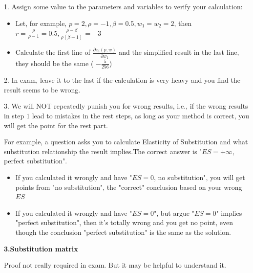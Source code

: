 \documentclass{article}
\begin{document}
\begin{mdframed}[backgroundcolor=yellow!20,linecolor=white]
1. Assign some value to the parameters and variables to verify your calculation:

\begin{itemize}
\item Let, for example, $p = 2, \rho = -1, \beta = 0.5, w_1 = w_2 = 2$, then $r =  \frac{\rho}{\rho -1} = 0.5 , \frac{\rho -\beta}{\rho(\beta -1)} = -3$
\item Calculate the first line of $\frac{\partial x_i(p,w)}{\partial w_1}$ and the simplified result in the last line, they should be the same ( $- \frac{5}{256}$)
\end{itemize}
2. In exam, leave it to the last if the calculation is very heavy and you find the result seems to be wrong.

3. We will NOT repeatedly punish you for wrong results, i.e., if the wrong results in step $1$ lead to mistakes in the rest steps, as long as your method is correct, you will get the point for the rest part. 

For example, a question asks you to calculate Elasticity of Substitution and  what substitution relationship the result implies.The correct answer is "$ES = + \infty$, perfect substitution". 
\begin{itemize}
\item   If you calculated it wrongly and have "$ES = 0$, no substitution", you will get points from "no substitution", the "correct" conclusion based on your wrong $ES$
\item   If you calculated it wrongly and have "$ES = 0$", but argue "$ES = 0$" implies "perfect substitution", then it's
totally wrong and you get no point, even though the conclusion "perfect substitution" is the same as the solution.
\end{itemize}

\end{mdframed}

\vspace{3mm}
\textbf{3.Substitution matrix}

Proof not really required in exam. But it may be helpful to understand it.
\end{document}
